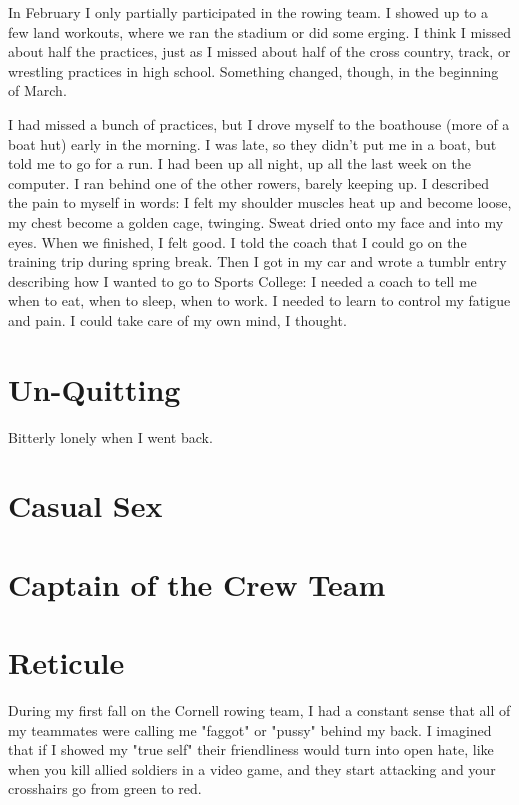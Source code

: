\documentclass[12pt]{article}
\begin{document}
In February I only partially participated in the rowing team.  I showed up to a
few land workouts, where we ran the stadium or did some erging.  I think I
missed about half the practices, just as I missed about half of the cross
country, track, or wrestling practices in high school.  Something changed,
though, in the beginning of March.

I had missed a bunch of practices, but I drove myself to the boathouse (more of
a boat hut) early in the morning.  I was late, so they didn't put me in a boat,
but told me to go for a run.  I had been up all night, up all the last week on
the computer.  I ran behind one of the other rowers, barely keeping up.  I
described the pain to myself in words: I felt my shoulder muscles heat up and
become loose, my chest become a golden cage, twinging.  Sweat dried onto my face
and into my eyes.  When we finished, I felt good.  I told the coach that I could
go on the training trip during spring break.  Then I got in my car and wrote a
tumblr entry describing how I wanted to go to Sports College: I needed a coach
to tell me when to eat, when to sleep, when to work.  I needed to learn to
control my fatigue and pain.  I could take care of my own mind, I thought.





\section{Un-Quitting}
Bitterly lonely when I went back.

\section{Casual Sex}

\section{Captain of the Crew Team}

\section{Reticule}
During my first fall on the Cornell rowing team, I had a constant sense that all
of my teammates were calling me "faggot" or "pussy" behind my back.  I imagined
that if I showed my "true self" their friendliness would turn into open hate,
like when you kill allied soldiers in a video game, and they start attacking and
your crosshairs go from green to red.  
\end{document}
